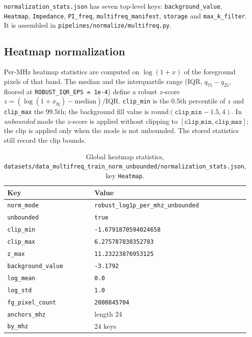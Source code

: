 \texttt{normalization\_stats.json} has seven top-level keys: \texttt{background\_value},
\texttt{Heatmap}, \texttt{Impedance}, \texttt{PI\_freq}, \texttt{multifreq\_manifest},
\texttt{storage} and \texttt{max\_k\_filter}. It is assembled in
\texttt{pipelines/normalize/multifreq.py}.

\subsection{Heatmap normalization}
\label{subsec:appA_heatmap_norm}

Per-MHz heatmap statistics are computed on $\log(1+x)$ of the foreground pixels of that band. The
median and the interquartile range (IQR, $q_{75}-q_{25}$, floored at
\texttt{ROBUST\_IQR\_EPS = 1e-4}) define a robust $z$-score
$z = (\log(1+x_{\mathrm{fg}}) - \mathrm{median})/\mathrm{IQR}$. \texttt{clip\_min} is the 0.5th
percentile of $z$ and \texttt{clip\_max} the 99.5th; the background fill value is
$\mathrm{round}(\texttt{clip\_min} - 1.5, 4)$. In \emph{unbounded} mode the $z$-score is applied
without clipping to $[\texttt{clip\_min}, \texttt{clip\_max}]$; the clip is applied only when the
mode is not unbounded. The stored statistics still record the clip bounds.

\begin{table}[htbp]
\centering
\caption{Global heatmap statistics,
\texttt{datasets/\allowbreak{}data\_\allowbreak{}multifreq\_\allowbreak{}train\_\allowbreak{}norm\_\allowbreak{}unbounded/\allowbreak{}normalization\_\allowbreak{}stats.json}, key
\texttt{Heatmap}.}
\label{tab:appA_heatmap_stats}
\begin{tabular}{p{} p{}}
\hline
Key & Value \\
\hline
\texttt{norm\_mode} & \texttt{robust\_\allowbreak{}log1p\_\allowbreak{}per\_\allowbreak{}mhz\_\allowbreak{}unbounded} \\
\texttt{unbounded} & \texttt{true} \\
\texttt{clip\_min} & \texttt{-1.6791870594024658} \\
\texttt{clip\_max} & \texttt{6.275787830352783} \\
\texttt{z\_max} & \texttt{11.23223876953125} \\
\texttt{background\_value} & \texttt{-3.1792} \\
\texttt{log\_mean} & \texttt{0.0} \\
\texttt{log\_std} & \texttt{1.0} \\
\texttt{fg\_pixel\_count} & \texttt{2000845704} \\
\texttt{anchors\_mhz} & length 24 \\
\texttt{by\_mhz} & 24 keys \\
\hline
\end{tabular}
\end{table}

